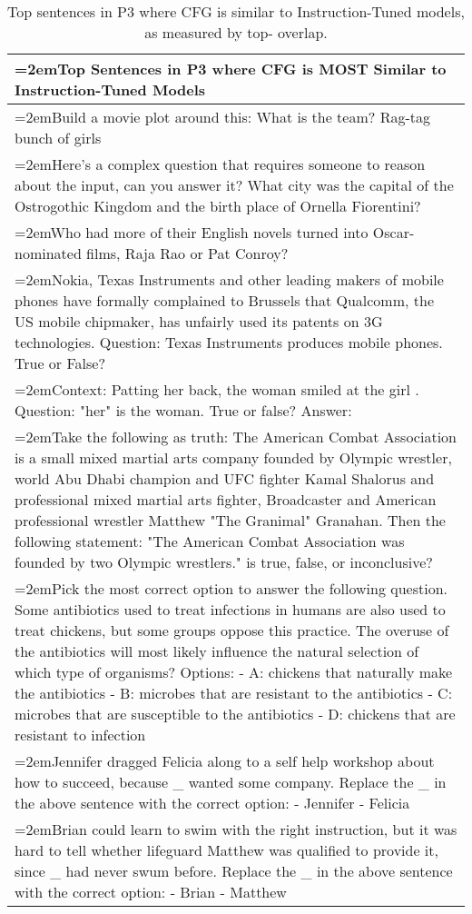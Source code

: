 \documentclass{article}
\begin{document}
\begin{table}[t]
    \centering
    \begin{tabularx}{\linewidth}{>{\hangindent=2em}X}
    \toprule
    Top Sentences in P3 where CFG is MOST Similar to Instruction-Tuned Models\\
    \midrule
Build a movie plot around this: What is the team? Rag-tag bunch of girls\\
Here's a complex question that requires someone to reason about the input, can you answer it? What city was the capital of the Ostrogothic Kingdom and the birth place of Ornella Fiorentini?\\
Who had more of their English novels turned into Oscar-nominated films, Raja Rao or Pat Conroy?\\
Nokia, Texas Instruments and other leading makers of mobile phones have formally complained to Brussels that Qualcomm, the US mobile chipmaker, has unfairly used its patents on 3G technologies. Question: Texas Instruments produces mobile phones. True or False?\\
Context: Patting her back, the woman smiled at the girl .    Question: "her" is the woman. True or false?   Answer:\\
Take the following as truth: The American Combat Association is a small mixed martial arts company founded by Olympic wrestler, world Abu Dhabi champion and UFC fighter Kamal Shalorus and professional mixed martial arts fighter, Broadcaster and American professional wrestler Matthew "The Granimal" Granahan.  Then the following statement: "The American Combat Association was founded by two Olympic wrestlers." is true, false, or inconclusive? \\
Pick the most correct option to answer the following question.  Some antibiotics used to treat infections in humans are also used to treat chickens, but some groups oppose this practice. The overuse of the antibiotics will most likely influence the natural selection of which type of organisms?  Options:  - A: chickens that naturally make the antibiotics  - B: microbes that are resistant to the antibiotics  - C: microbes that are susceptible to the antibiotics  - D: chickens that are resistant to infection  \\
Jennifer dragged Felicia along to a self help workshop about how to succeed, because \_ wanted some company. Replace the \_ in the above sentence with the correct option:  - Jennifer - Felicia \\
Brian could learn to swim with the right instruction, but it was hard to tell whether lifeguard Matthew was qualified to provide it, since \_ had never swum before. Replace the \_ in the above sentence with the correct option:  - Brian - Matthew \\
\bottomrule
\end{tabularx}
    \caption{Top sentences in P3 where CFG is similar to Instruction-Tuned models, as measured by top- overlap.}
    \label{tab:topp_cfg}
\end{table}
\end{document}

